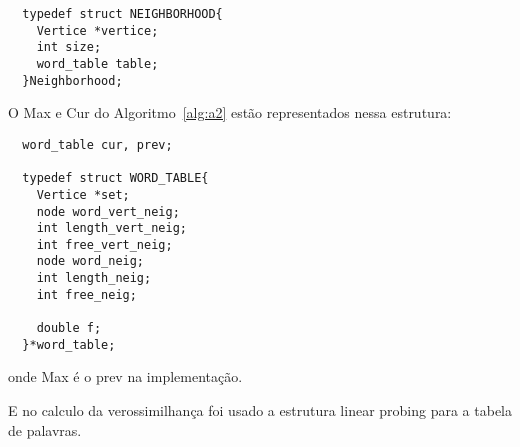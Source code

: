 \documentclass[a4paper, 12pt]{article}
\begin{document}
\begin{lstlisting}
  typedef struct NEIGHBORHOOD{
    Vertice *vertice;
    int size;
    word_table table;
  }Neighborhood;
\end{lstlisting}

O Max e Cur do Algoritmo~\ref{alg:a2} estão representados nessa estrutura:

\begin{lstlisting}
  word_table cur, prev;

  typedef struct WORD_TABLE{
    Vertice *set;
    node word_vert_neig;
    int length_vert_neig;
    int free_vert_neig;
    node word_neig;
    int length_neig;
    int free_neig;
    
    double f;
  }*word_table;
\end{lstlisting}

onde Max é o prev na implementação.

E no calculo da verossimilhança foi usado a estrutura linear probing para a tabela de palavras.
\end{document}

